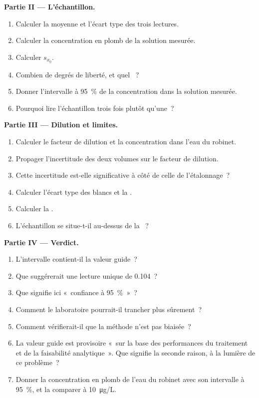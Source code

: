 \begin{problem}
\medskip
\noindent\textbf{Partie II --- L'échantillon.}
\begin{enumerate}[resume]
  \item Calculer la moyenne et l'écart type des trois lectures.
  \item Calculer la concentration en plomb de la solution mesurée.
  \item Calculer $s_{x_0}$.
  \item Combien de degrés de liberté, et quel ~?
  \item Donner l'intervalle à 95~\% de la concentration dans la solution mesurée.
  \item Pourquoi lire l'échantillon trois fois plutôt qu'une~?
\end{enumerate}

\medskip
\noindent\textbf{Partie III --- Dilution et limites.}
\begin{enumerate}[resume]
  \item Calculer le facteur de dilution et la concentration dans l'eau du robinet.
  \item Propager l'incertitude des deux volumes sur le facteur de dilution.
  \item Cette incertitude est-elle significative à côté de celle de l'étalonnage~?
  \item Calculer l'écart type des blancs et la .
  \item Calculer la .
  \item L'échantillon se situe-t-il au-dessus de la ~?
\end{enumerate}

\medskip
\noindent\textbf{Partie IV --- Verdict.}
\begin{enumerate}[resume]
  \item L'intervalle contient-il la valeur guide~?
  \item Que suggérerait une lecture unique de 0.104~?
  \item Que signifie ici «~confiance à 95~\%~»~?
  \item Comment le laboratoire pourrait-il trancher plus sûrement~?
  \item Comment vérifierait-il que la méthode n'est pas biaisée~?
  \item La valeur guide est provisoire «~sur la base des performances du traitement et de la faisabilité
        analytique~». Que signifie la seconde raison, à la lumière de ce problème~?
  \item Donner la concentration en plomb de l'eau du robinet avec son intervalle à 95~\%, et la comparer
        à \qty{10}{\micro g/L}.
\end{enumerate}
\end{problem}

